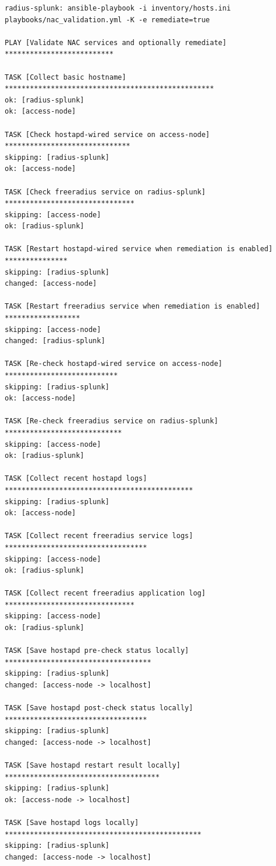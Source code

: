 \documentclass[11pt]{article}
\begin{document}
\begin{verbatim}
radius-splunk: ansible-playbook -i inventory/hosts.ini playbooks/nac_validation.yml -K -e remediate=true

PLAY [Validate NAC services and optionally remediate] **************************

TASK [Collect basic hostname] **************************************************
ok: [radius-splunk]
ok: [access-node]

TASK [Check hostapd-wired service on access-node] ******************************
skipping: [radius-splunk]
ok: [access-node]

TASK [Check freeradius service on radius-splunk] *******************************
skipping: [access-node]
ok: [radius-splunk]

TASK [Restart hostapd-wired service when remediation is enabled] ***************
skipping: [radius-splunk]
changed: [access-node]

TASK [Restart freeradius service when remediation is enabled] ******************
skipping: [access-node]
changed: [radius-splunk]

TASK [Re-check hostapd-wired service on access-node] ***************************
skipping: [radius-splunk]
ok: [access-node]

TASK [Re-check freeradius service on radius-splunk] ****************************
skipping: [access-node]
ok: [radius-splunk]

TASK [Collect recent hostapd logs] *********************************************
skipping: [radius-splunk]
ok: [access-node]

TASK [Collect recent freeradius service logs] **********************************
skipping: [access-node]
ok: [radius-splunk]

TASK [Collect recent freeradius application log] *******************************
skipping: [access-node]
ok: [radius-splunk]

TASK [Save hostapd pre-check status locally] ***********************************
skipping: [radius-splunk]
changed: [access-node -> localhost]

TASK [Save hostapd post-check status locally] **********************************
skipping: [radius-splunk]
changed: [access-node -> localhost]

TASK [Save hostapd restart result locally] *************************************
skipping: [radius-splunk]
ok: [access-node -> localhost]

TASK [Save hostapd logs locally] ***********************************************
skipping: [radius-splunk]
changed: [access-node -> localhost]


\end{verbatim}
\end{document}
